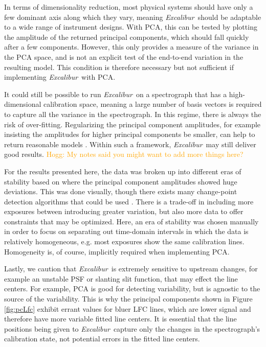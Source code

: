 \documentclass[modern]{aastex63}
\newcommand{\project}[1]{\textsl{#1}}
\newcommand{\name}{\project{Excalibur}}
\newcommand{\lz}[1]{\textcolor{orange}{#1}}
\begin{document}
In terms of dimensionality reduction, most physical systems should have only a few dominant axis along which they vary, meaning \name\ should be adaptable to a wide range of instrument designs.  With PCA, this can be tested by plotting the amplitude of the returned principal components, which should fall quickly after a few components.  However, this only provides a measure of the variance in the PCA space, and is not an explicit test of the end-to-end variation in the resulting model.  This condition is therefore necessary but not sufficient if implementing \name\ with PCA.

It could still be possible to run \name\ on a spectrograph that has a high-dimensional calibration space, meaning a large number of basis vectors is required to capture all the variance in the spectrograph.  In this regime, there is always the risk of over-fitting.  Regularizing the principal component amplitudes, for example insisting the amplitudes for higher principal components be smaller, can help to return reasonable models \citep{formanmackey2015} .  Within such a framework, \name\ may still deliver good results.
\lz{Hogg: My notes said you might want to add more things here?}

For the results presented here, the data was broken up into different eras of stability based on where the principal component amplitudes showed huge deviations.  This was done visually, though there exists many change-point detection algorithms that could be used \citep{aminikhanghahi2017}.  There is a trade-off in including more exposures between introducing greater variation, but also more data to offer constraints that may be optimized.  Here, an era of stability was chosen  manually in order to focus on separating out time-domain intervals in which the data is relatively homogeneous, e.g. most exposures show the same calibration lines.  Homogeneity is, of course, implicitly required when implementing PCA.

Lastly, we caution that \name\ is extremely sensitive to upstream changes, for example an unstable PSF or slanting slit function, that may effect the line centers.  For example, PCA is good for detecting variability, but is agnostic to the source of the variability.  This is why the principal components shown in Figure \ref{fig:pcLfc} exhibit errant values for bluer LFC lines, which are lower signal and therefore have more variable fitted line centers.  It is essential that the line positions being given to \name\ capture only the changes in the spectrograph's calibration state, not potential errors in the fitted line centers. 
\end{document}
